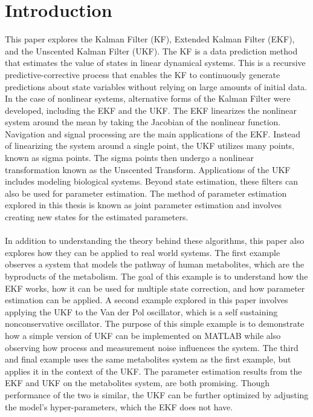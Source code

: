 \chapter{Introduction}
\label{Introduction}

This paper explores the Kalman Filter (KF), Extended Kalman Filter (EKF), and the Unscented Kalman Filter (UKF). The KF is a data prediction method that estimates the value of states in linear dynamical systems. This is a recursive predictive-corrective process that enables the KF to continuously generate predictions about state variables without relying on large amounts of initial data. In the case of nonlinear systems, alternative forms of the Kalman Filter were developed, including the EKF and the UKF. The EKF linearizes the nonlinear system around the mean by taking the Jacobian of the nonlinear function. Navigation and signal processing are the main applications of the EKF. Instead of linearizing the system around a single point, the UKF utilizes many points, known as sigma points. The sigma points then undergo a nonlinear transformation known as the Unscented Transform. Applications of the UKF includes modeling biological systems. Beyond state estimation, these filters can also be used for parameter estimation. The method of parameter estimation explored in this thesis is known as joint parameter estimation and involves creating new states for the estimated parameters. \\ \\

\noindent In addition to understanding the theory behind these algorithms, this paper also explores how they can be applied to real world systems. The first example observes a system that models the pathway of human metabolites, which are the byproducts of the metabolism. The goal of this example is to understand how the EKF works, how it can be used for multiple state correction, and how parameter estimation can be applied. A second example explored in this paper involves applying the UKF to the Van der Pol oscillator, which is a self sustaining nonconservative oscillator. The purpose of this simple example is to demonstrate how a simple version of UKF can be implemented on MATLAB while also observing how process and measurement noise influences the system. The third and final example uses the same metabolites system as the first example, but applies it in the context of the UKF. The parameter estimation results from the EKF and UKF on the metabolites system, are both promising. Though performance of the two is similar, the UKF can be further optimized by adjusting the model's hyper-parameters, which the EKF does not have. \\ \\

